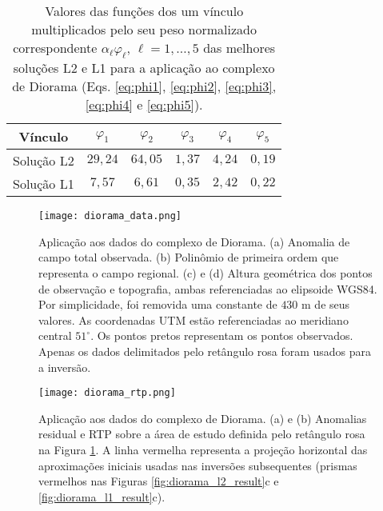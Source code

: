 \begin{table}[h]\label{tab:diorama}
	\caption{Valores das funções dos um vínculo multiplicados pelo seu peso normalizado correspondente $ \alpha_\ell \varphi_\ell  $, $ \ell=1,\dots,5 $ das melhores soluções L2 e L1 para a aplicação ao complexo de Diorama (Eqs. \ref{eq:phi1}, \ref{eq:phi2}, \ref{eq:phi3}, \ref{eq:phi4} e \ref{eq:phi5}).}
	\centering
	\vspace{0.5cm}
	\begin{tabular}{c|ccccc}
		Vínculo & $ \varphi _1 $ & $ \varphi _2 $ &  $ \varphi _3 $ &  $ \varphi _4 $ &  $ \varphi _5 $ \\
		\hline
		Solução L2 & $ 29,24 $ & $ 64,05 $ & $ 1,37 $ & $ 4,24 $ & $ 0,19 $ \\ 
		Solução L1 & $ 7,57 $ & $ 6,61 $ & $ 0,35 $ & $ 2,42 $ & $ 0,22 $
	\end{tabular}
\end{table}



\begin{figure}[!htb]
	\texttt{[image: diorama\_data.png]}
	\caption{Aplicação aos dados do complexo de Diorama. 
		(a) Anomalia de campo total observada.
		(b) Polinômio de primeira ordem que representa o campo regional.
		(c) e (d) Altura geométrica dos pontos de observação e topografia,
		ambas referenciadas ao elipsoide WGS84. Por simplicidade, foi removida uma constante de $430$ m de seus valores. As coordenadas UTM estão referenciadas ao meridiano central $51^{\circ}$. Os pontos pretos representam os pontos observados. Apenas os dados delimitados pelo retângulo rosa foram usados para a inversão. 
	}
	\label{fig:diorama_data}
\end{figure}
\pagebreak

\begin{figure}[!htb]
	\texttt{[image: diorama\_rtp.png]}
	\caption{Aplicação aos dados do complexo de Diorama. 
		(a) e (b) Anomalias residual e RTP sobre a área de estudo definida pelo retângulo rosa na Figura \ref{fig:diorama_data}.
		A linha vermelha representa a projeção horizontal das aproximações iniciais usadas nas inversões subsequentes (prismas vermelhos nas Figuras \ref{fig:diorama_l2_result}c e \ref{fig:diorama_l1_result}c).
	}
	\label{fig:diorama_rtp_residual}
\end{figure}

